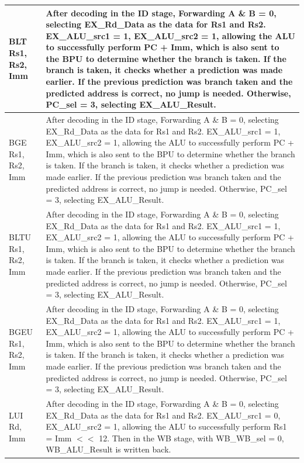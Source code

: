 \documentclass[12pt,a4paper]{report}
\begin{document}
\begin{longtable}{|l|p{12cm}|}
BLT Rs1, Rs2, Imm & After decoding in the ID stage, Forwarding A \& B = 0, selecting EX\_Rd\_Data as the data for Rs1 and Rs2. EX\_ALU\_src1 = 1, EX\_ALU\_src2 = 1, allowing the ALU to successfully perform PC + Imm, which is also sent to the BPU to determine whether the branch is taken. If the branch is taken, it checks whether a prediction was made earlier. If the previous prediction was branch taken and the predicted address is correct, no jump is needed. Otherwise, PC\_sel = 3, selecting EX\_ALU\_Result. \\
\hline

BGE Rs1, Rs2, Imm & After decoding in the ID stage, Forwarding A \& B = 0, selecting EX\_Rd\_Data as the data for Rs1 and Rs2. EX\_ALU\_src1 = 1, EX\_ALU\_src2 = 1, allowing the ALU to successfully perform PC + Imm, which is also sent to the BPU to determine whether the branch is taken. If the branch is taken, it checks whether a prediction was made earlier. If the previous prediction was branch taken and the predicted address is correct, no jump is needed. Otherwise, PC\_sel = 3, selecting EX\_ALU\_Result. \\
\hline

BLTU Rs1, Rs2, Imm & After decoding in the ID stage, Forwarding A \& B = 0, selecting EX\_Rd\_Data as the data for Rs1 and Rs2. EX\_ALU\_src1 = 1, EX\_ALU\_src2 = 1, allowing the ALU to successfully perform PC + Imm, which is also sent to the BPU to determine whether the branch is taken. If the branch is taken, it checks whether a prediction was made earlier. If the previous prediction was branch taken and the predicted address is correct, no jump is needed. Otherwise, PC\_sel = 3, selecting EX\_ALU\_Result. \\
\hline

BGEU Rs1, Rs2, Imm & After decoding in the ID stage, Forwarding A \& B = 0, selecting EX\_Rd\_Data as the data for Rs1 and Rs2. EX\_ALU\_src1 = 1, EX\_ALU\_src2 = 1, allowing the ALU to successfully perform PC + Imm, which is also sent to the BPU to determine whether the branch is taken. If the branch is taken, it checks whether a prediction was made earlier. If the previous prediction was branch taken and the predicted address is correct, no jump is needed. Otherwise, PC\_sel = 3, selecting EX\_ALU\_Result. \\
\hline

LUI Rd, Imm & After decoding in the ID stage, Forwarding A \& B = 0, selecting EX\_Rd\_Data as the data for Rs1 and Rs2. EX\_ALU\_src1 = 0, EX\_ALU\_src2 = 1, allowing the ALU to successfully perform Rs1 = Imm $<<$ 12. Then in the WB stage, with WB\_WB\_sel = 0, WB\_ALU\_Result is written back. \\
\hline


\end{longtable}
\end{document}
